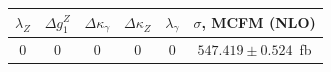 \begin{table}[!ht]
  \begin{center}
  \begin{tabular} {|c c c|c c|c|}
\hline
  $\lambda_Z$ & $\Delta g^Z_1$ & $\Delta\kappa_{\gamma}$ & $\Delta\kappa_Z$ & $\lambda_{\gamma}$ & $\sigma$, MCFM (NLO)\\
  \hline
  0           & 0              & 0                       & 0                & 0               &  $547.419\pm0.524$~fb \\
  \hline

\end{tabular}
\end{center}
\end{table}
